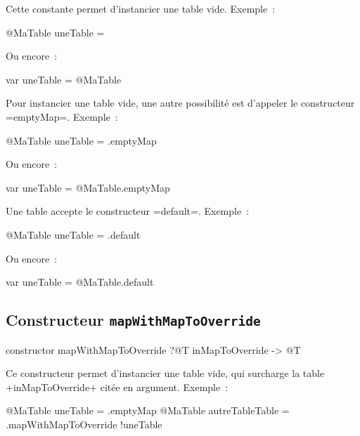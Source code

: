 
Cette constante permet d'instancier une table vide. Exemple~:
\begin{galgas}
@MaTable uneTable = {}
\end{galgas}

Ou encore~:

\begin{galgas}
var uneTable = @MaTable {}
\end{galgas}


Pour instancier une table vide, une autre possibilité est d'appeler le constructeur \ggs=emptyMap=. Exemple~:
\begin{galgas}
@MaTable uneTable = .emptyMap
\end{galgas}

Ou encore~:

\begin{galgas}
var uneTable = @MaTable.emptyMap
\end{galgas}

 



Une table accepte le constructeur \ggs=default=. Exemple~:
\begin{galgas}
@MaTable uneTable = .default
\end{galgas}

Ou encore~:

\begin{galgas}
var uneTable = @MaTable.default
\end{galgas}

 

\subsection{Constructeur \texttt{mapWithMapToOverride}}

\begin{galgas}
constructor mapWithMapToOverride ?@T inMapToOverride -> @T
\end{galgas}

Ce constructeur permet d'instancier une table vide, qui surcharge la table \ggs+inMapToOverride+ citée en argument. Exemple~:
\begin{galgas}
@MaTable uneTable = .emptyMap
@MaTable autreTableTable = .mapWithMapToOverride {!uneTable}
\end{galgas}






